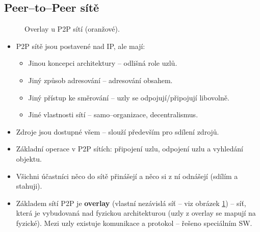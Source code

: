 \documentclass[11pt,a4paper]{article}
\begin{document}
\subsection{Peer--to--Peer sítě}
\begin{figure}[h!]
\begin{center}
\caption{Overlay u P2P sítí (oranžové).}
\label{p2p_overlay}
\end{center}
\end{figure}
\begin{itemize}
\item P2P sítě jsou postavené nad IP, ale mají:
\begin{itemize}
\item Jinou koncepci architektury -- odlišná role uzlů.
\item Jiný způsob adresování -- adresování obsahem.
\item Jiný přístup ke směrování -- uzly se odpojují/připojují libovolně.
\item Jiné vlastnosti sítí -- samo--organizace, decentralismus.
\end{itemize}
\item Zdroje jsou dostupné všem -- slouží především pro sdílení zdrojů.
\item Základní operace v P2P sítích: připojení uzlu, odpojení uzlu a vyhledání objektu.
\item Všichni účastníci něco do sítě přinášejí a něco si z ní odnášejí (sdílím a stahuji).
\item Základem sítí P2P je \textbf{overlay} (vlastní nezávislá síť -- viz obrázek \ref{p2p_overlay}) -- síť, která je vybudovaná nad fyzickou architekturou (uzly z overlay se mapují na fyzické). Mezi uzly existuje komunikace a protokol -- řešeno speciálním SW.
\end{itemize}
\end{document}
